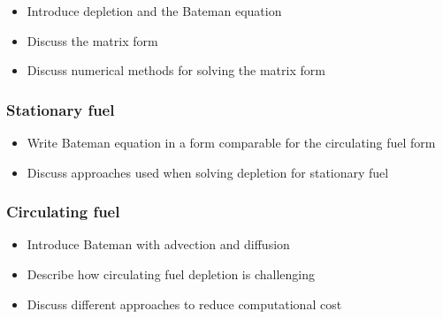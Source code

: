 \begin{itemize}
    \item Introduce depletion and the Bateman equation
    \item Discuss the matrix form
    \item Discuss numerical methods for solving the matrix form
\end{itemize}

\subsubsection{Stationary fuel}

\begin{itemize}
    \item Write Bateman equation in a form comparable for the circulating fuel form
    \item Discuss approaches used when solving depletion for stationary fuel
\end{itemize}


\subsubsection{Circulating fuel}
\label{sec:circ-fuel-dep}

\begin{itemize}
    \item Introduce Bateman with advection and diffusion
    \item Describe how circulating fuel depletion is challenging
    \item Discuss different approaches to reduce computational cost
\end{itemize}